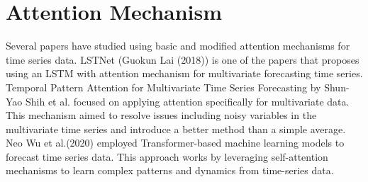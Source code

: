 \section{Attention Mechanism}

Several papers have studied using basic and modified attention mechanisms for time series data. LSTNet (Guokun Lai (2018)) is one of the papers that proposes using an LSTM with attention mechanism for multivariate forecasting time series. Temporal Pattern Attention for Multivariate Time Series Forecasting by Shun-Yao Shih et al. focused on applying attention specifically for multivariate data. This mechanism aimed to resolve issues including noisy variables in the multivariate time series and introduce a better method than a simple average. Neo Wu et al.(2020) employed Transformer-based machine learning models to forecast time series data. This approach works by leveraging self-attention mechanisms to learn complex patterns and dynamics from time-series data.